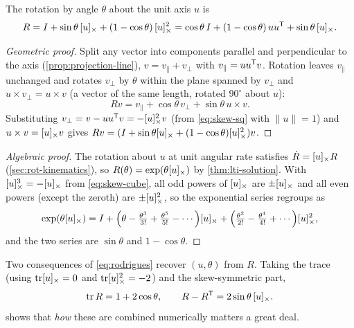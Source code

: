\begin{theorem}
\label{thm:rodrigues}
The rotation by angle $\theta$ about the unit axis $u$ is
\begin{equation}
  R = I + \sin\theta\,[u]_{\times} + (1 - \cos\theta)\,[u]_{\times}^2
    = \cos\theta\, I + (1-\cos\theta)\,u u^{\mathsf{T}} + \sin\theta\,[u]_{\times}.
  \label{eq:rodrigues}
\end{equation}
\end{theorem}
\begin{proof}[Geometric proof]
Split any vector into components parallel and perpendicular to the axis (\cref{prop:projection-line}), $v = v_\parallel + v_\perp$ with
$v_\parallel = u u^{\mathsf{T}} v$. Rotation leaves $v_\parallel$ unchanged and rotates $v_\perp$ by $\theta$ within the plane spanned by $v_\perp$ and
$u \times v_\perp = u \times v$ (a vector of the same length, rotated $90^\circ$ about $u$):
\begin{equation*}
  Rv = v_\parallel + \cos\theta\, v_\perp + \sin\theta\, u \times v .
\end{equation*}
Substituting $v_\perp = v - uu^{\mathsf{T}} v = -[u]_{\times}^2 v$ (from \eqref{eq:skew-sq} with $\|u\|=1$) and $u \times v = [u]_{\times}v$ gives
$Rv = (I + \sin\theta[u]_{\times} + (1 - \cos\theta)[u]_{\times}^2)v$.
\end{proof}
\begin{proof}[Algebraic proof]
The rotation about $u$ at unit angular rate satisfies $\dot R = [u]_{\times} R$ (\cref{sec:rot-kinematics}), so $R(\theta) = \exp(\theta[u]_{\times})$ by
\cref{thm:lti-solution}. With $[u]_{\times}^3 = -[u]_{\times}$ from \eqref{eq:skew-cube}, all odd powers of $[u]_{\times}$ are $\pm[u]_{\times}$ and all even powers
(except the zeroth) are $\pm[u]_{\times}^2$, so the exponential series regroups as
\begin{equation*}
  \exp(\theta[u]_{\times}) = I + \Big(\theta - \tfrac{\theta^3}{3!} + \tfrac{\theta^5}{5!} - \cdots\Big)[u]_{\times}
     + \Big(\tfrac{\theta^2}{2!} - \tfrac{\theta^4}{4!} + \cdots\Big)[u]_{\times}^2,
\end{equation*}
and the two series are $\sin\theta$ and $1 - \cos\theta$.
\end{proof}

Two consequences of \eqref{eq:rodrigues} recover $(u, \theta)$ from $R$. Taking the trace (using $\operatorname{tr}[u]_{\times} = 0$ and $\operatorname{tr}[u]_{\times}^2 = -2$) and the
skew-symmetric part,
\begin{equation}
  \operatorname{tr} R = 1 + 2\cos\theta, \qquad R - R^{\mathsf{T}} = 2\sin\theta\,[u]_{\times}.
  \label{eq:trace-angle}
\end{equation}
 shows that \emph{how} these are combined numerically matters a great deal.

